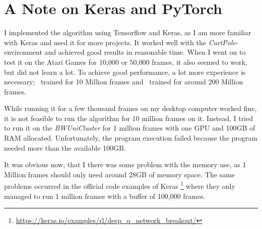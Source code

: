 \documentclass[a4paper,12pt,
headsepline,           %
oneside,               %
bibtotoc,              %
]{scrbook}
\begin{document}


\clearpage
\thispagestyle{empty}

\clearpage
\restoregeometry


\chapter{A Note on Keras and PyTorch}\label{appendix:keras}

I implemented the algorithm using Tensorflow and Keras, as I am more familiar with Keras and used it for more projects. It worked well with the \emph{CartPole}-environment and achieved good results in reasonable time. When I went on to test it on the Atari Games for 10,000 or 50,000 frames, it also seemed to work, but did not learn a lot. To achieve good performance, a lot more experience is necessary;~\parencite{mnih_playing_2013} trained for 10 Million frames and~\parencite{van_hasselt_deep_2015} trained for around 200 Million frames.

While running it for a few thousand frames on my desktop computer worked fine, it is not feasible to run the algorithm for 10 million frames on it. Instead, I tried to run it on the \emph{BWUniCluster} for 1 million frames with one GPU and 100GB of RAM allocated. Unfortunately, the program execution failed because the program needed more than the available 100GB.

It was obvious now, that I there was some problem with the memory use, as 1 Million frames should only need around 28GB of memory space. The same problems occurred in the official code examples of Keras%
\footnote{\url{https://keras.io/examples/rl/deep_q_network_breakout/}} %
where they only managed to run 1 million frames with a buffer of 100,000 frames.
\end{document}
